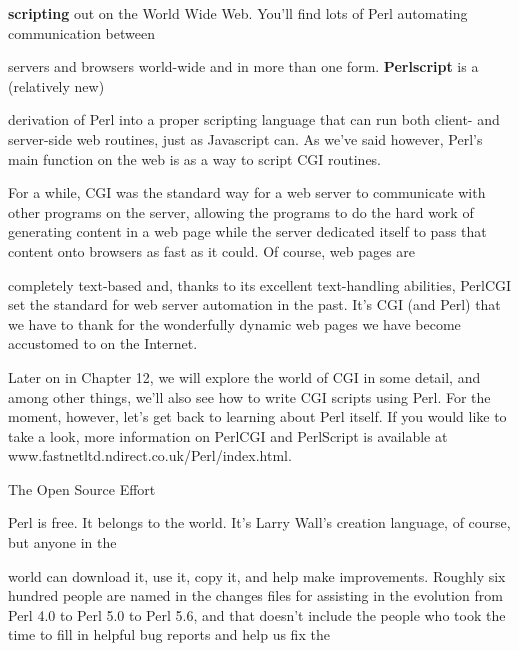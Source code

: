\documentclass[a4paper,11pt]{book}
\begin{document}
\noindent 

\noindent 

\noindent \textbf{scripting }out on the World Wide  Web.  You'll  find  lots  of  Perl  automating  communication  between

\noindent servers and browsers world-wide  and  in  more  than  one  form.  \textbf{Perlscript  }is  a  (relatively  new)

\noindent derivation of Perl into  a  proper  scripting  language  that  can  run  both  client-  and server-side  web routines,  just as Javascript can.  As  we've  said  however,  Perl's  main  function  on  the web  is  as  a  way to script CGI routines.

\noindent 

\noindent For a while, CGI was the standard way for a web server to communicate with other programs on the server, allowing the programs to do the hard work of generating content in a web page while the server dedicated itself to pass that content onto browsers as fast as it could. Of course, web pages are

\noindent completely text-based and, thanks to its excellent text-handling abilities, PerlCGI set the standard for web server automation in the past. It's CGI (and Perl) that we have to thank for the wonderfully dynamic web pages we have become accustomed to on the Internet.

\noindent 

\noindent Later on in Chapter 12, we will explore the world of CGI in some detail, and among other things, we'll also see how to write CGI scripts using Perl. For the moment, however, let's get back to learning about Perl itself. If you would like to take a look, more information on PerlCGI and PerlScript is available at www.fastnetltd.ndirect.co.uk/Perl/index.html.

\noindent 

\noindent The Open Source Effort

\noindent 

\noindent Perl is free.  It  belongs  to  the  world.  It's  Larry Wall's creation  language,  of  course,  but  anyone  in  the

\noindent world  can  download it,  use  it,  copy  it,  and  help  make  improvements.  Roughly  six  hundred  people  are named in the  changes files for  assisting in the evolution  from  Perl  4.0 to  Perl  5.0 to  Perl  5.6,  and  that doesn't  include the people who  took  the  time  to  fill  in  helpful  bug  reports  and  help  us  fix  the
\end{document}
